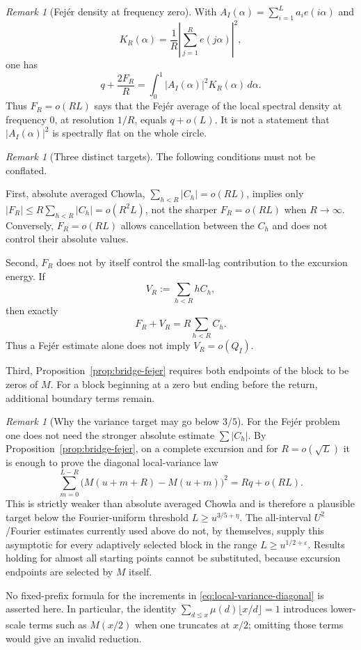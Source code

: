 \documentclass[11pt]{amsart}
\numberwithin{equation}{section}
\theoremstyle{plain}
\theoremstyle{definition}
\theoremstyle{remark}
\newtheorem{remark}[theorem]{Remark}
\newcommand{\eps}{\varepsilon}
\begin{document}
\begin{remark}[Fej\'er density at frequency zero]
\label{rem:fejer-spectrum}
With $A_I(\alpha)=\sum_{i=1}^La_ie(i\alpha)$ and
\[
K_R(\alpha)=\frac1R\left|\sum_{j=1}^Re(j\alpha)\right|^2,
\]
one has
\[
q+\frac{2F_R}{R}=\int_0^1|A_I(\alpha)|^2K_R(\alpha)\,d\alpha.
\]
Thus $F_R=o(RL)$ says that the Fej\'er average of the local spectral density
at frequency $0$, at resolution $1/R$, equals $q+o(L)$. It is not a
statement that $|A_I(\alpha)|^2$ is spectrally flat on the whole circle.
\end{remark}

\begin{remark}[Three distinct targets]
\label{rem:three-chowla-targets}
The following conditions must not be conflated.

First, absolute averaged Chowla,
$\sum_{h<R}|C_h|=o(RL)$, implies only
$|F_R|\le R\sum_{h<R}|C_h|=o(R^2L)$, not the sharper
$F_R=o(RL)$ when $R\to\infty$. Conversely, $F_R=o(RL)$ allows cancellation
between the $C_h$ and does not control their absolute values.

Second, $F_R$ does not by itself control the small-lag contribution to the
excursion energy. If
\[
V_R:=\sum_{h<R}hC_h,
\]
then exactly
\begin{equation}
\label{eq:F-V-relation}
F_R+V_R=R\sum_{h<R}C_h.
\end{equation}
Thus a Fej\'er estimate alone does not imply $V_R=o(Q_I)$.

Third, Proposition~\ref{prop:bridge-fejer} requires both endpoints of the
block to be zeros of $M$. For a block beginning at a zero but ending before
the return, additional boundary terms remain.
\end{remark}

\begin{remark}[Why the variance target may go below $3/5$]
\label{rem:variance-target}
For the Fej\'er problem one does not need the stronger absolute estimate
$\sum|C_h|$. By Proposition~\ref{prop:bridge-fejer}, on a complete excursion
and for $R=o(\sqrt L)$ it is enough to prove the diagonal local-variance law
\[
\sum_{m=0}^{L-R}\bigl(M(u+m+R)-M(u+m)\bigr)^2
=Rq+o(RL).
\]
This is strictly weaker than absolute averaged Chowla and is therefore a
plausible target below the Fourier-uniform threshold $L\ge u^{3/5+\eta}$.
The all-interval $U^2$/Fourier estimates currently used above do not, by
themselves, supply this asymptotic for every adaptively selected block in
the range $L\ge u^{1/2+\eps}$. Results holding for almost all starting
points cannot be substituted, because excursion endpoints are selected by
$M$ itself.

No fixed-prefix formula for the increments in
\eqref{eq:local-variance-diagonal} is asserted here. In particular, the
identity $\sum_{d\le x}\mu(d)\lfloor x/d\rfloor=1$ introduces lower-scale
terms such as $M(x/2)$ when one truncates at $x/2$; omitting those terms
would give an invalid reduction.
\end{remark}
\end{document}
